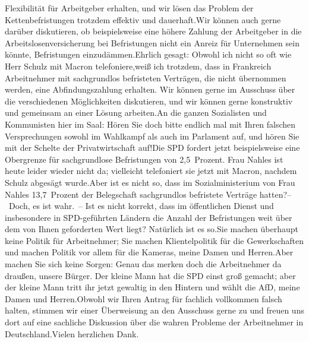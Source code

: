 \documentclass{article}
\begin{document}
Flexibilität für Arbeitgeber erhalten, und wir lösen das Problem der Kettenbefristungen trotzdem effektiv und dauerhaft.Wir können auch gerne darüber diskutieren, ob beispielsweise eine höhere Zahlung der Arbeitgeber in die Arbeitslosenversicherung bei Befristungen nicht ein Anreiz für Unternehmen sein könnte, Befristungen einzudämmen.Ehrlich gesagt: Obwohl ich nicht so oft wie Herr Schulz mit Macron telefoniere,weiß ich trotzdem, dass in Frankreich Arbeitnehmer mit sachgrundlos befristeten Verträgen, die nicht übernommen werden, eine Abfindungszahlung erhalten. Wir können gerne im Ausschuss über die verschiedenen Möglichkeiten diskutieren, und wir können gerne konstruktiv und gemeinsam an einer Lösung arbeiten.An die ganzen Sozialisten und Kommunisten hier im Saal: Hören Sie doch bitte endlich mal mit Ihren falschen Versprechungen sowohl im Wahlkampf als auch im Parlament auf, und hören Sie mit der Schelte der Privatwirtschaft auf!Die SPD fordert jetzt beispielsweise eine Obergrenze für sachgrundlose Befristungen von 2,5 Prozent. Frau Nahles ist heute leider wieder nicht da; vielleicht telefoniert sie jetzt mit Macron, nachdem Schulz abgesägt wurde.Aber ist es nicht so, dass im Sozialministerium von Frau Nahles 13,7 Prozent der Belegschaft sachgrundlos befristete Verträge hatten?– Doch, es ist wahr. – Ist es nicht korrekt, dass im öffentlichen Dienst und insbesondere in SPD-geführten Ländern die Anzahl der Befristungen weit über dem von Ihnen geforderten Wert liegt? Natürlich ist es so.Sie machen überhaupt keine Politik für Arbeitnehmer; Sie machen Klientelpolitik für die Gewerkschaften und machen Politik vor allem für die Kameras, meine Damen und Herren.Aber machen Sie sich keine Sorgen: Genau das merken doch die Arbeitnehmer da draußen, unsere Bürger. Der kleine Mann hat die SPD einst groß gemacht; aber der kleine Mann tritt ihr jetzt gewaltig in den Hintern und wählt die AfD, meine Damen und Herren.Obwohl wir Ihren Antrag für fachlich vollkommen falsch halten, stimmen wir einer Überweisung an den Ausschuss gerne zu und freuen uns dort auf eine sachliche Diskussion über die wahren Probleme der Arbeitnehmer in Deutschland.Vielen herzlichen Dank.
\end{document}

